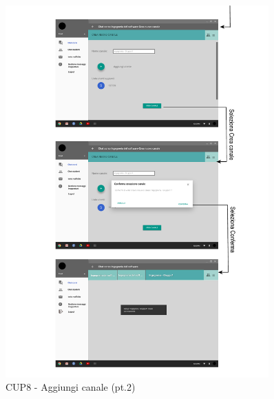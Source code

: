 \begin{figure}
	\centering
	\includegraphics[width=0.9\textwidth]{imgs/gruppo6/activities/act_cup8_aggiungi_canale2.pdf}
	\caption{CUP8 - Aggiungi canale (pt.2)}
	\label{fig:cup8-2}
\end{figure}

